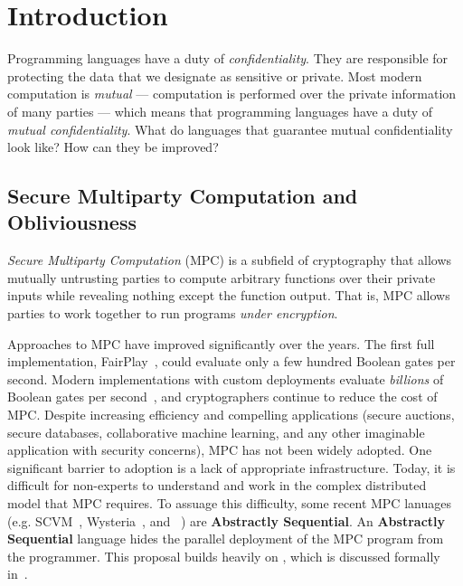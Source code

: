 \chapter{Introduction}
\label{ch:intro}

Programming languages have a duty of \emph{confidentiality}. They are responsible for protecting the
data that we designate as sensitive or private. Most modern computation is \emph{mutual} --- computation
is performed over the private information of many parties --- which means that programming languages
have a duty of \emph{mutual confidentiality}. What do languages that guarantee mutual confidentiality look
like? How can they be improved?

\section{Secure Multiparty Computation and Obliviousness}
\label{sec:intro-mpc-obliv}

\emph{Secure Multiparty Computation} (MPC) is a subfield of cryptography
that allows mutually untrusting parties to compute arbitrary functions over their private inputs while revealing nothing
except the function output. That is, MPC allows parties to work together to run programs \emph{under encryption}.

Approaches to MPC have improved significantly over the years. The first full implementation, FairPlay~\cite{USENIX:MNPS04}, could evaluate
only a few hundred Boolean gates per second. Modern implementations with custom deployments evaluate \emph{billions} of Boolean gates per
second~\cite{CCS:AFLNO16}, and cryptographers continue to reduce the cost of MPC. Despite increasing efficiency and compelling applications
(secure auctions, secure databases, collaborative machine learning, and any other imaginable application with security concerns),
MPC has not been widely adopted. One significant barrier to adoption is a lack of appropriate infrastructure. Today, it is difficult
for non-experts to understand and work in the complex distributed model that MPC requires. To assuage this difficulty, some recent
MPC lanuages (e.g. SCVM~\cite{liu14scram}, Wysteria~\cite{rastogi14wysteria}, and \system~\cite{symphony22}) are
\textbf{Abstractly Sequential}. An \textbf{Abstractly Sequential} language hides the parallel deployment of the MPC
program from the programmer. This proposal builds heavily on \system, which is discussed formally in~.

